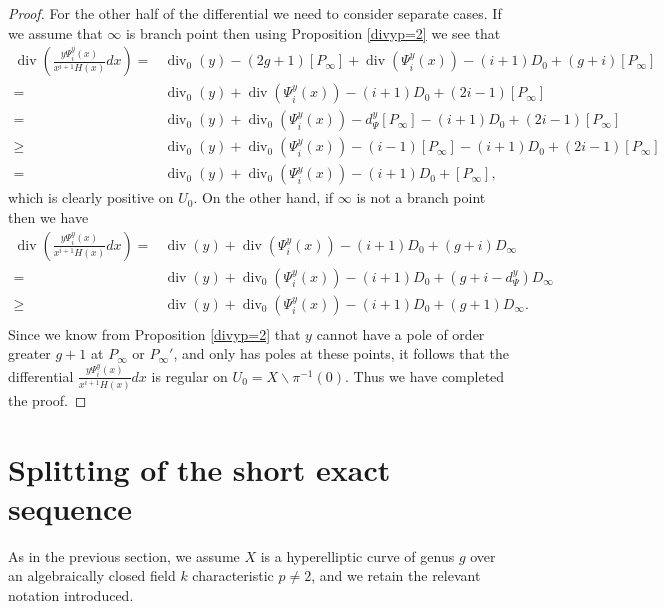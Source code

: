 \documentclass[11pt]{article} %
\theoremstyle{plain}
\theoremstyle{remark}
\DeclareMathOperator{\di}{div}
\begin{document}
\begin{proof}
For the other half of the differential we need to consider separate cases.
If we assume that $\infty$ is branch point then  using Proposition \ref{divyp=2} we see that
\begin{align*}
\di\left(\frac{y\Psi_i^y(x) }{x^{i+1}H(x)}dx \right)  =  & \di_0(y) - (2g+1)[P_\infty] + \di(\Psi_i^y(x)) - (i+1)D_0 + (g+i)[P_\infty] \\
 =  & \di_0(y) + \di(\Psi_i^y(x)) -(i+1)D_0 + (2i -1)[P_\infty] \\
 = &  \di_0(y) + \di_0(\Psi_i^y(x)) - d_\Psi^y[P_\infty] - (i+1)D_0 + (2i-1)[P_\infty] \\
 \geq &  \di_0(y) + \di_0(\Psi_i^y(x)) -(i-1)[P_\infty] -(i+1)D_0 + (2i-1)[P_\infty] \\
 =   &\di_0(y) + \di_0(\Psi_i^y(x)) -(i+1)D_0 + [P_\infty],
\end{align*}
which is clearly positive on $U_0$.
On the other hand, if $\infty$ is not a branch point then we have
\begin{align*}
\di\left(\frac{y\Psi_i^y(x) }{x^{i+1}H(x)}dx \right)  =  & \di(y) + \di(\Psi_i^y(x)) - (i+1)D_0 + (g+i)D_\infty \\
= & \di(y) + \di_0(\Psi_i^y(x)) - (i+1)D_0 + (g+i - d_\Psi^y)D_\infty \\
\geq & \di(y) + \di_0(\Psi_i^y(x)) - (i+1)D_0 + (g+1)D_\infty. \\
\end{align*}
Since we know from Proposition \ref{divyp=2} that $y$ cannot have a pole of order greater $g+1$ at $P_\infty$ or $P_\infty'$, and only has poles at these points, it follows that the differential $\frac{y\Psi_i^y(x) }{x^{i+1}H(x)}dx$ is regular on $U_0 = X \backslash \pi^{-1}(0)$.
Thus we have completed the proof.


\end{proof}



\section{Splitting of the short exact sequence}


As in the previous section, we assume $X$ is a hyperelliptic curve of genus $g$ over an algebraically closed field $k$ characteristic $p \neq 2$, and we retain the relevant notation introduced.
\end{document}
